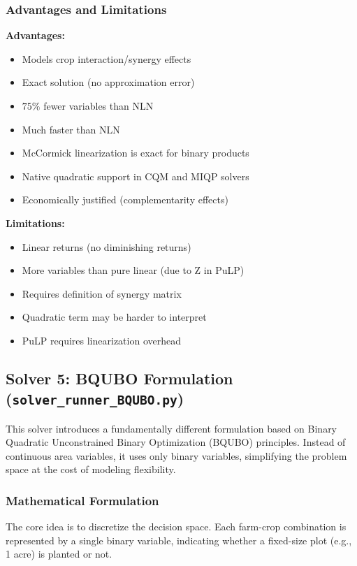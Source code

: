 \documentclass[11pt,a4paper]{article}
\begin{document}
\subsubsection{Advantages and Limitations}

\textbf{Advantages:}
\begin{itemize}
    \item Models crop interaction/synergy effects
    \item Exact solution (no approximation error)
    \item $75\%$ fewer variables than NLN
    \item Much faster than NLN
    \item McCormick linearization is exact for binary products
    \item Native quadratic support in CQM and MIQP solvers
    \item Economically justified (complementarity effects)
\end{itemize}

\textbf{Limitations:}
\begin{itemize}
    \item Linear returns (no diminishing returns)
    \item More variables than pure linear (due to Z in PuLP)
    \item Requires definition of synergy matrix
    \item Quadratic term may be harder to interpret
    \item PuLP requires linearization overhead
\end{itemize}

\subsection{Solver 5: BQUBO Formulation (\texttt{solver\_runner\_BQUBO.py})}

This solver introduces a fundamentally different formulation based on Binary Quadratic Unconstrained Binary Optimization (BQUBO) principles. Instead of continuous area variables, it uses only binary variables, simplifying the problem space at the cost of modeling flexibility.

\subsubsection{Mathematical Formulation}

The core idea is to discretize the decision space. Each farm-crop combination is represented by a single binary variable, indicating whether a fixed-size plot (e.g., 1 acre) is planted or not.
\end{document}

